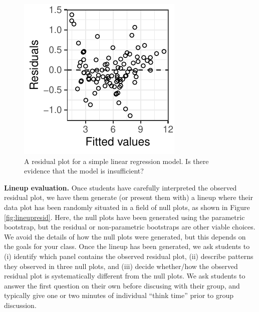 \documentclass[12pt]{article}
\begin{document}
\begin{figure}

{\centering \includegraphics{figs/observed_residual} 

}

\caption{\label{fig:residplot} A residual plot for a simple linear regression model. Is there evidence that the model is insufficient?}\label{fig:residual plot}
\end{figure}

\textbf{Lineup evaluation.} Once students have carefully interpreted the
observed residual plot, we have them generate (or present them with) a
lineup where their data plot has been randomly situated in a field of
null plots, as shown in Figure \ref{fig:lineupresid}. Here, the null
plots have been generated using the parametric bootstrap, but the
residual or non-parametric bootstraps are other viable choices. We avoid
the details of how the null plots were generated, but this depends on
the goals for your class. Once the lineup has been generated, we ask
students to (i) identify which panel contains the observed residual
plot, (ii) describe patterns they observed in three null plots, and
(iii) decide whether/how the observed residual plot is systematically
different from the null plots. We ask students to answer the first
question on their own before discusing with their group, and typically
give one or two minutes of individual ``think time'' prior to group
discussion.
\end{document}
